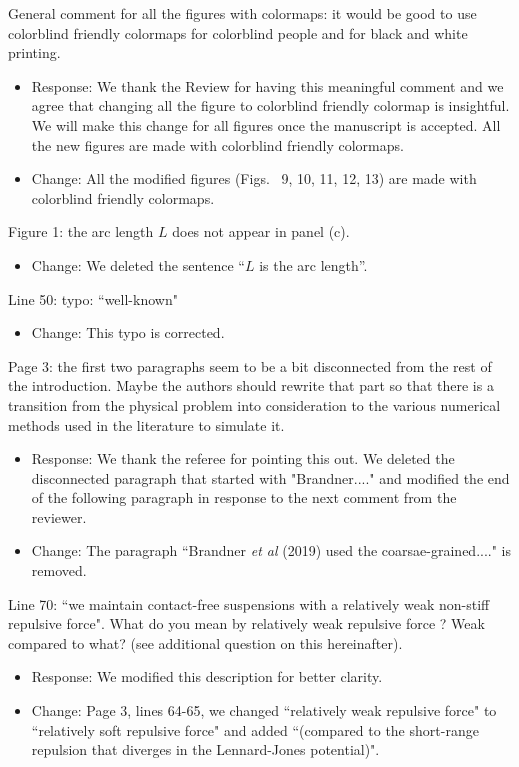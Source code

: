 \documentclass[11pt]{article}
\newcommand{\comment}[1]{{\color{blue} #1}}
\begin{document}
\noindent
\comment{General comment for all the figures with colormaps: it would be
good to use colorblind friendly colormaps for colorblind people and for
black and white printing.}
\begin{itemize}
  \item Response: We thank the Review for having this meaningful comment and we agree that changing all the figure 
to colorblind friendly colormap is insightful. We will make this change for all figures once the manuscript is accepted. All the new figures are made with colorblind friendly colormaps.

\item Change: All the modified figures (Figs.~ 9, 10, 11, 12,  13) are made with colorblind friendly colormaps. 
\end{itemize}

\noindent
\comment{Figure 1: the arc length $L$ does not appear in panel (c).}
\begin{itemize}
  \item Change: We deleted the sentence ``$L$ is the arc length''.
\end{itemize}

\noindent
\comment{Line 50: typo: ``well-known"}
\begin{itemize}
  \item Change: This typo is corrected.
\end{itemize}

\noindent
\comment{Page 3: the first two paragraphs seem to be a bit disconnected
from the rest of the introduction. Maybe the authors should rewrite that
part so that there is a transition from the physical problem into
consideration to the various numerical methods used in the literature to
simulate it.}
\begin{itemize}
 \item Response: We thank the referee for pointing this out. We deleted the disconnected paragraph that started with "Brandner...." and modified the end of the following paragraph in response to the next comment from the reviewer.
  \item Change: The paragraph ``Brandner {\it et al} (2019) used the coarsae-grained...." is removed.
\end{itemize}

\noindent
\comment{Line 70: ``we maintain contact-free suspensions with a
relatively weak non-stiff repulsive force". What do you mean by
relatively weak repulsive force ? Weak compared to what? (see additional
question on this hereinafter).}
\begin{itemize}
  \item Response: We modified this description for better clarity.
  \item Change: Page 3, lines 64-65, we changed ``relatively weak repulsive force" to ``relatively soft repulsive force" and added ``(compared to the short-range repulsion that diverges in the Lennard-Jones potential)".
  
\end{itemize}
\end{document}
